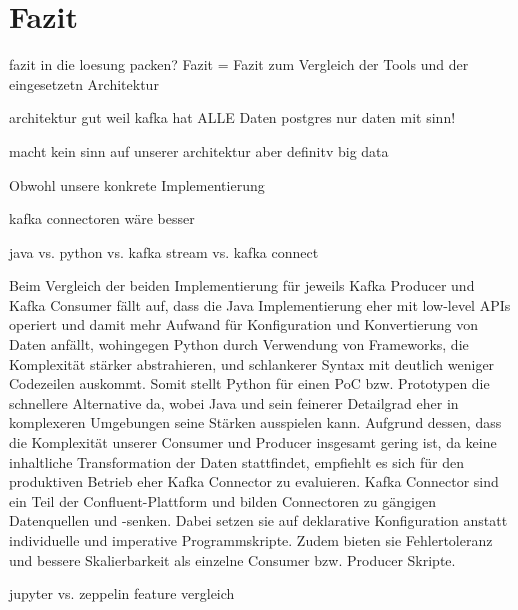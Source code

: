 \chapter{Fazit}
\label{chap:fazit}

fazit in die loesung packen? Fazit = Fazit zum Vergleich der Tools und der eingesetzetn Architektur

architektur gut weil
kafka hat ALLE Daten
postgres nur daten mit sinn!

macht kein sinn auf unserer architektur aber definitv big data


Obwohl unsere konkrete Implementierung

kafka connectoren wäre besser

java vs. python vs. kafka stream vs. kafka connect

Beim Vergleich der beiden Implementierung für jeweils Kafka Producer und Kafka Consumer fällt auf, dass die Java Implementierung eher mit low-level APIs operiert und damit mehr Aufwand für Konfiguration und Konvertierung von Daten anfällt, wohingegen Python durch Verwendung von Frameworks, die Komplexität stärker abstrahieren, und schlankerer Syntax mit deutlich weniger Codezeilen auskommt. Somit stellt Python für einen PoC bzw. Prototypen die schnellere Alternative da, wobei Java und sein feinerer Detailgrad eher in komplexeren Umgebungen seine Stärken ausspielen kann.\newline
Aufgrund dessen, dass die Komplexität unserer Consumer und Producer insgesamt gering ist, da keine inhaltliche Transformation der Daten stattfindet, empfiehlt es sich für den produktiven Betrieb eher Kafka Connector zu evaluieren. Kafka Connector sind ein  Teil der Confluent-Plattform und bilden Connectoren zu gängigen Datenquellen und -senken. Dabei setzen sie auf deklarative Konfiguration anstatt individuelle und imperative Programmskripte. Zudem bieten sie Fehlertoleranz und bessere Skalierbarkeit als einzelne Consumer bzw. Producer Skripte.


jupyter vs. zeppelin feature vergleich


